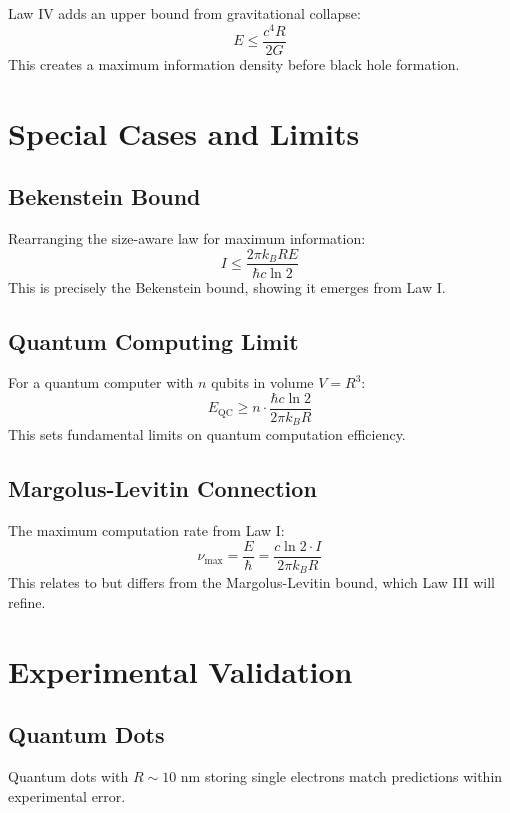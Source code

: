 \documentclass[11pt,a4paper]{article}
\theoremstyle{definition}
\begin{document}
Law IV adds an upper bound from gravitational collapse:
\begin{equation}
E \leq \frac{c^4 R}{2G}
\end{equation}
This creates a maximum information density before black hole formation.

\section{Special Cases and Limits}

\subsection{Bekenstein Bound}

Rearranging the size-aware law for maximum information:
\begin{equation}
I \leq \frac{2\pi k_B R E}{\hbar c \ln 2}
\end{equation}
This is precisely the Bekenstein bound, showing it emerges from Law I.

\subsection{Quantum Computing Limit}

For a quantum computer with $n$ qubits in volume $V = R^3$:
\begin{equation}
E_{\text{QC}} \geq n \cdot \frac{\hbar c \ln 2}{2\pi k_B R}
\end{equation}
This sets fundamental limits on quantum computation efficiency.

\subsection{Margolus-Levitin Connection}

The maximum computation rate from Law I:
\begin{equation}
\nu_{\text{max}} = \frac{E}{\hbar} = \frac{c \ln 2 \cdot I}{2\pi k_B R}
\end{equation}
This relates to but differs from the Margolus-Levitin bound, which Law III will refine.

\section{Experimental Validation}

\subsection{Quantum Dots}
Quantum dots with $R \sim 10$ nm storing single electrons match predictions within experimental error.
\end{document}
